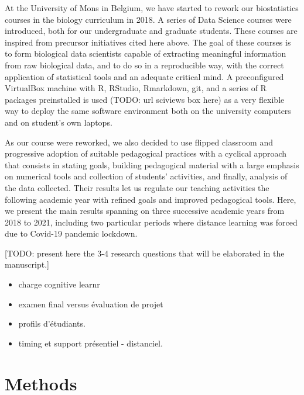 \documentclass{aims}
\theoremstyle{definition}
\begin{document}
At the University of Mons in Belgium, we have started to rework our
biostatistics courses in the biology curriculum in 2018. A series of
Data Science courses were introduced, both for our undergraduate and
graduate students. These courses are inspired from precursor initiatives
cited here above. The goal of these courses is to form biological data
scientists capable of extracting meaningful information from raw
biological data, and to do so in a reproducible way, with the correct
application of statistical tools and an adequate critical mind. A
preconfigured VirtualBox machine with R, RStudio, Rmarkdown, git, and a
series of R packages preinstalled is used (TODO: url sciviews box here)
as a very flexible way to deploy the same software environment both on
the university computers and on student's own laptops.

As our course were reworked, we also decided to use flipped classroom
and progressive adoption of suitable pedagogical practices with a
cyclical approach that consists in stating goals, building pedagogical
material with a large emphasis on numerical tools and collection of
students' activities, and finally, analysis of the data collected. Their
results let us regulate our teaching activities the following academic
year with refined goals and improved pedagogical tools. Here, we present
the main results spanning on three successive academic years from 2018
to 2021, including two particular periods where distance learning was
forced due to Covid-19 pandemic lockdown.

{[}TODO: present here the 3-4 research questions that will be elaborated
in the manuscript.{]}

\begin{itemize}
\item
  charge cognitive learnr
\item
  examen final versus évaluation de projet
\item
  profils d'étudiants.
\item
  timing et support présentiel - distanciel.
\end{itemize}

\hypertarget{methods}{%
\section{Methods}\label{methods}}
\end{document}
